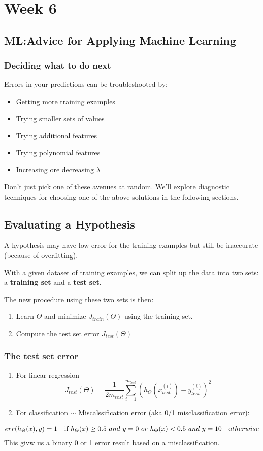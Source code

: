 \chapter{Week 6}
\section{ML:Advice for Applying Machine Learning}
\subsection{Deciding what to do next}
Errors in your predictions can be troubleshooted by:
\begin{itemize}
	\item Getting more training examples
	\item Trying smaller sets of values
	\item Trying additional features
	\item Trying polynomial features
	\item Increasing ore decreasing $\lambda$
\end{itemize}
Don't just pick one of these avenues at random. We'll explore diagnostic techniques for choosing one of the above solutions in the following sections.
\section{Evaluating a Hypothesis}
A hypothesis may have low error for the training examples but still be inaccurate (because of overfitting).

With a given dataset of training examples, we can split up the data into two sets: a \textbf{training set} and a \textbf{test set}.

The new procedure using these two sets is then:

\begin{enumerate}
	\item Learn $\Theta$ and minimize $J_{train}(\Theta)$ using the training set.
	\item Compute the test set error $J_{test}(\Theta)$
\end{enumerate}
\subsection{The test set error}
\begin{enumerate}
\item For linear regression
\[J_{test}(\Theta) = \dfrac{1}{2m_{test}} \sum_{i=1}^{m_{test}}(h_\Theta(x^{(i)}_{test}) - y^{(i)}_{test})^2
\]
\item For classification $\sim$ Miscalssification error (aka 0/1 misclassification error):
\end{enumerate}
\begin{equation}
err(h_\Theta(x),y) =
\begin{matrix}
1 & \mbox{if } h_\Theta(x) \geq 0.5\ and\ y = 0\ or\ h_\Theta(x) < 0.5\ and\ y = 1\newline
0 & \mbox otherwise 
\end{matrix}
\end{equation}
This givw us a binary 0 or 1 error result based on a misclassification.

